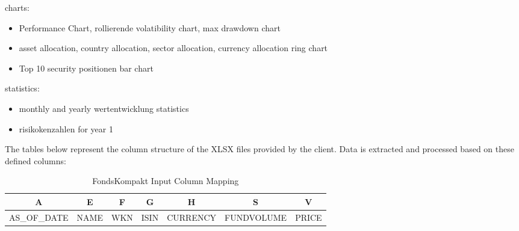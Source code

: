 





charts:
\begin{itemize}
    \item Performance Chart, rollierende volatibility chart, max drawdown chart 
    \item asset allocation, country allocation, sector allocation, currency allocation ring chart 
    \item Top 10 security positionen bar chart 
\end{itemize}

statistics:
\begin{itemize}    
    \item monthly and yearly wertentwicklung statistics 
    \item risikokenzahlen for year 1 
\end{itemize}

\noindent
The tables below represent the column structure of the XLSX files provided by the client. 
Data is extracted and processed based on these defined columns:



\begin{table}[H]
\centering
\begin{tabular}{|c|c|c|c|c|c|c|}
\hline
A & E & F & G & H & S & V \\
\hline
AS\_OF\_DATE & NAME & WKN & ISIN & CURRENCY & FUNDVOLUME & PRICE \\
\hline
\end{tabular}
\caption{FondsKompakt Input Column Mapping}
\label{tab:fondskompakt-columns}
\end{table}


